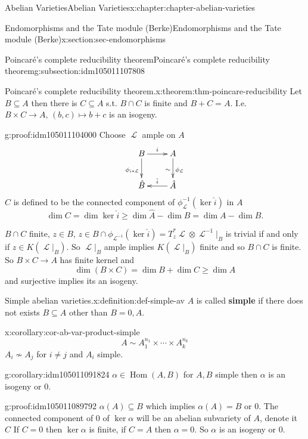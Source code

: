 \documentclass[oneside,10pt,]{book}
\newcommand{\terminology}[1]{\textbf{#1}}
\numberwithin{equation}{section}
\newcommand{\sheaf}[1]{\operatorname{\mathcal{#1}}}
\DeclareMathOperator{\Hom}{Hom}
\begin{document}
\begin{chapterptx}{Abelian Varieties}{}{Abelian Varieties}{}{}{x:chapter:chapter-abelian-varieties}
\begin{sectionptx}{Endomorphisms and the Tate module (Berke)}{}{Endomorphisms and the Tate module (Berke)}{}{}{x:section:sec-endomorphisms}
\begin{subsectionptx}{Poincaré's complete reducibility theorem}{}{Poincaré's complete reducibility theorem}{}{}{g:subsection:idm105011107808}
\begin{theorem}{Poincaré's complete reducibility theorem.}{}{x:theorem:thm-poincare-reducibility}
Let \(B\subseteq A\) then there is \(C\subseteq A\) s.t. \(B \cap C\) is finite and \(B+C = A\). I.e. \(B\times C \to A,\,(b,c) \mapsto b+c\) is an isogeny.%
\end{theorem}
\begin{proofptx}{}{g:proof:idm105011104000}
Choose \(\sheaf L\) ample on \(A\)%
\begin{equation*}
\xymatrix{
B\ar[r]^i \ar[d]_{\phi_{i*\sheaf L}} & A \ar[d]_\sim^{\phi_{\sheaf L}} \\
\hat B & \hat A \ar[l]_{\hat i}
}
\end{equation*}
\(C\) is defined to be the connected component of \(\phi^{-1}_{\sheaf L}(\ker \hat i)\) in \(A\)%
\begin{equation*}
\dim C = \dim \ker \hat i \ge \dim \hat A - \dim \hat B = \dim A - \dim B\text{.}
\end{equation*}
%
\par
\(B \cap C\) finite, \(z\in B\), \(z\in B\cap \phi_{\sheaf L^{-1}} (\ker \hat i) = T_z^* \sheaf L \otimes \sheaf L^{-1} |_B\) is trivial if and only if \(z\in K(\sheaf L|_B)\). So \(\sheaf L|_B\) ample implies \(K(\sheaf L|_B)\) finite and so \(B\cap C\) is finite. So \(B\times C \to A\) has finite kernel and%
\begin{equation*}
\dim (B\times C) = \dim B + \dim C \ge \dim A
\end{equation*}
and surjective implies its an isogeny.%
\end{proofptx}
\begin{definition}{Simple abelian varieties.}{x:definition:def-simple-av}%
\(A\) is called \terminology{simple} if there does not exists \(B\subseteq A\) other than \(B = 0,A\).%
\end{definition}
\begin{corollary}{}{}{x:corollary:cor-ab-var-product-simple}%
%
\begin{equation*}
A \sim A_1^{n_1} \times \cdots \times A_k^{n_k}
\end{equation*}
\(A_i \not\sim A_j\) for \(i\ne j\) and \(A_i\) simple.%
\end{corollary}
\begin{corollary}{}{}{g:corollary:idm105011091824}%
\(\alpha \in \Hom(A,B)\) for \(A,B\) simple then \(\alpha\) is an isogeny or \(0\).%
\end{corollary}
\begin{proofptx}{}{g:proof:idm105011089792}
\(\alpha(A) \subseteq B\) which implies \(\alpha(A)  = B\) or \(0\). The connected component of 0 of \(\ker \alpha\) will be an abelian subvariety of \(A\), denote it \(C\) If \(C = 0\) then \(\ker \alpha\) is finite, if \(C = A\) then \(\alpha = 0\). So \(\alpha\) is an isogeny or \(0\).%

\end{proofptx}
\end{subsectionptx}
\end{sectionptx}
\end{chapterptx}
\end{document}
